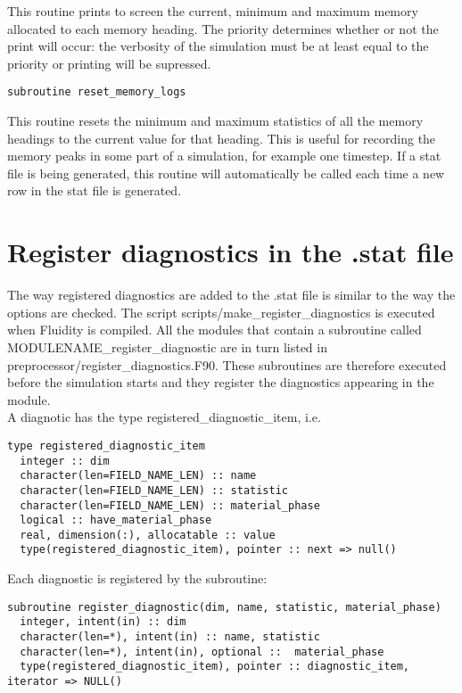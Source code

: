 \documentclass[a4paper, 11pt]{book}
\begin{document}
This routine prints to screen the current, minimum and maximum memory
allocated to each memory heading. The priority determines whether or not the
print will occur: the verbosity of the simulation must be at least equal to
the priority or printing will be supressed.


\begin{lstlisting}
subroutine reset_memory_logs  
\end{lstlisting}

This routine resets the minimum and maximum statistics of all the memory
headings to the current value for that heading. This is useful for recording
the memory peaks in some part of a simulation, for example one timestep. If
 a stat file is being generated, this routine will automatically be called
 each time a new row in the stat file is generated.

\section{Register diagnostics in the .stat file}

The way registered diagnostics are added to the .stat file is similar to the way the options are checked. The script scripts/make\_register\_diagnostics is executed when Fluidity is compiled. All the modules that contain a subroutine called MODULENAME\_register\_diagnostic are in turn listed in preprocessor/register\_diagnostics.F90. These subroutines are therefore executed before the simulation starts and they register the diagnostics appearing in the module.\\
 
A diagnotic has the type registered\_diagnostic\_item, i.e.

\begin{lstlisting}
type registered_diagnostic_item
  integer :: dim
  character(len=FIELD_NAME_LEN) :: name
  character(len=FIELD_NAME_LEN) :: statistic
  character(len=FIELD_NAME_LEN) :: material_phase
  logical :: have_material_phase
  real, dimension(:), allocatable :: value
  type(registered_diagnostic_item), pointer :: next => null()
\end{lstlisting}

Each diagnostic is registered by the subroutine:\\

\begin{lstlisting}
subroutine register_diagnostic(dim, name, statistic, material_phase)
  integer, intent(in) :: dim
  character(len=*), intent(in) :: name, statistic 
  character(len=*), intent(in), optional ::  material_phase
  type(registered_diagnostic_item), pointer :: diagnostic_item, iterator => NULL()
\end{lstlisting}
\end{document}
